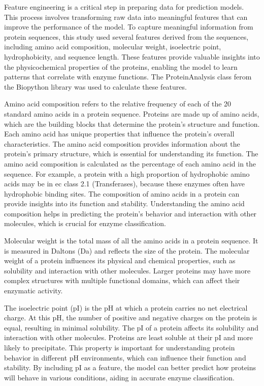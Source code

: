 Feature engineering is a critical step in preparing data for prediction models. This process involves transforming raw data into meaningful features that can improve the performance of the model. To capture meaningful information from protein sequences, this study used several features derived from the sequences, including amino acid composition, molecular weight, isoelectric point, hydrophobicity, and sequence length. These features provide valuable insights into the physicochemical properties of the proteins, enabling the model to learn patterns that correlate with enzyme functions. The ProteinAnalysis class ferom the Biopython library was used to calculate these features.

Amino acid composition refers to the relative frequency of each of the 20 standard amino acids in a protein sequence. Proteins are made up of amino acids, which are the building blocks that determine the protein's structure and function. Each amino acid has unique properties that influence the protein's overall characteristics. \autocite{ProteinStructureLearn}
The amino acid composition provides information about the protein's primary structure, which is essential for understanding its function. The amino acid composition is calculated as the percentage of each amino acid in the sequence. For example, a protein with a high proportion of hydrophobic amino acids may be in ec class 2.1 (Transferases), because these enzymes often have hydrophobic binding sites. \autocite{lightTransferaseHydrolaseRole2017}
The composition of amino acids in a protein can provide insights into its function and stability.  Understanding the amino acid composition helps in predicting the protein's behavior and interaction with other molecules, which is crucial for enzyme classification.

Molecular weight is the total mass of all the amino acids in a protein sequence. It is measured in Daltons (Da) and reflects the size of the protein. The molecular weight of a protein influences its physical and chemical properties, such as solubility and interaction with other molecules. Larger proteins may have more complex structures with multiple functional domains, which can affect their enzymatic activity.

The isoelectric point (pI) is the pH at which a protein carries no net electrical charge. At this pH, the number of positive and negative charges on the protein is equal, resulting in minimal solubility. The pI of a protein affects its solubility and interaction with other molecules. Proteins are least soluble at their pI and more likely to precipitate. This property is important for understanding protein behavior in different pH environments, which can influence their function and stability. By including pI as a feature, the model can better predict how proteins will behave in various conditions, aiding in accurate enzyme classification.

